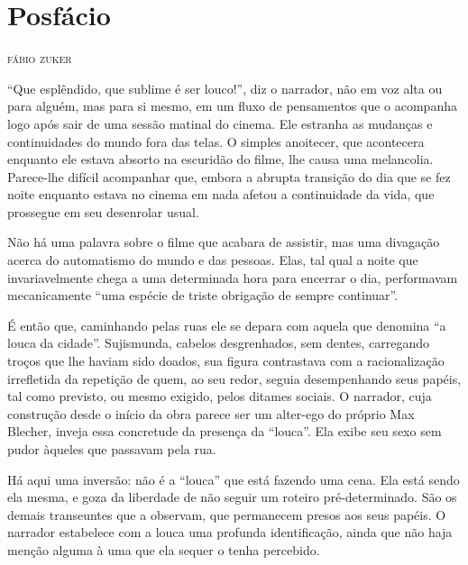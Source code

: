 \newcommand{\subtitulo}[1]{\NoCaseChange{\textnormal{\break\Large\itshape#1}}}
\chapter*{Posfácio\smallskip\subtitulo{A instabilidade do mundo\\de Max Blecher}}

\begin{flushright}
\textsc{fábio zuker}
\end{flushright}


“Que esplêndido, que sublime é ser louco!”, diz o narrador, não em voz alta ou para alguém, mas para si mesmo, em um fluxo de pensamentos que o acompanha logo após sair de uma sessão matinal do cinema. Ele estranha as mudanças e continuidades do mundo fora das telas. O simples anoitecer, que acontecera enquanto ele estava absorto na escuridão do filme, lhe causa uma melancolia. Parece-lhe difícil acompanhar que, embora a abrupta transição do dia que se fez noite enquanto estava no cinema em nada afetou a continuidade da vida, que prossegue em seu desenrolar usual.

Não há uma palavra sobre o filme que acabara de assistir, mas uma divagação acerca do automatismo do mundo e das pessoas. Elas, tal qual a noite que invariavelmente chega a uma determinada hora para encerrar o dia, performavam mecanicamente “uma espécie de triste obrigação de sempre continuar”. 

É então que, caminhando pelas ruas ele se depara com aquela que denomina “a louca da cidade”. Sujismunda, cabelos desgrenhados, sem dentes, carregando troços que lhe haviam sido doados, sua figura contrastava com a racionalização irrefletida da repetição de quem, ao seu redor, seguia desempenhando seus papéis, tal como previsto, ou mesmo exigido, pelos ditames sociais. O narrador, cuja construção desde o início da obra parece ser um alter-ego do próprio Max Blecher, inveja essa concretude da presença da “louca”. Ela exibe seu sexo sem pudor àqueles que passavam pela rua. 

Há aqui uma inversão: não é a “louca” que está fazendo uma cena. Ela está sendo ela mesma, e goza da liberdade de não seguir um roteiro pré-determinado. São os demais transeuntes que a observam, que permanecem presos aos seus papéis.  O narrador estabelece com a louca uma profunda identificação, ainda que não haja menção alguma à uma que ela sequer o tenha percebido.

